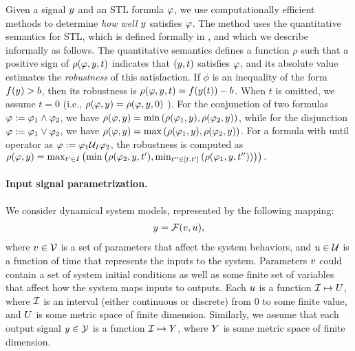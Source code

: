 Given a signal $y$ and an STL formula $\varphi$, we use computationally efficient methods to determine \emph{how well} $y$ satisfies $\varphi$.
The method uses the quantitative semantics for STL, which 
is defined formally in \cite{DonzeM10}, and which we describe informally as follows. The
quantitative semantics defines a function $\rho$ such that a positive sign of
$\rho(\varphi,y,t)$ indicates that $(y,t)$ satisfies
$\varphi$, and its absolute value estimates the \emph{robustness} of
this satisfaction. If $\phi$ is an inequality of the form
$f(y)>b$, then its robustness is $\rho(\varphi,y,t) = f(y(t))-b$.  
When $t$ is omitted, we assume $t=0$ (i.e., $\rho(\varphi,y)=\rho(\varphi,y,0)$ ).
For the conjunction of two
formulas $\varphi := \varphi_1 \wedge \varphi_2$, we have
$\rho(\varphi,y)=\min \left( \rho(\varphi_1,y),\rho(\varphi_2,y)\right)$,
while for the disjunction $\varphi := \varphi_1 \vee \varphi_2$, we have
$\rho(\varphi,y)=\max\left(\rho(\varphi_1,y),\rho(\varphi_2,y)\right)$.
For a formula with until operator as $\varphi := \varphi_1 \mathcal{U}_I \varphi_2$,
the robustness is computed as $\rho(\varphi,y) = \max_{t^\prime\in
  I}\left(\min\left(\rho(\varphi_2,y,t^\prime),\min_{t^{\prime\prime}\in
  [t,t^\prime]}\left(\rho(\varphi_1,y,t^{\prime\prime})\right)\right)\right).$

\paragraph{Input signal parametrization.} We consider dynamical system models, represented by the following mapping:
\begin{eqnarray}
y = \mathcal{F} (v, u),
\end{eqnarray}
where $v \in \mathcal{V}$ is a set of parameters that affect the system behaviors, and $u \in \mathcal{U}$ is a function of time that represents the inputs to the system.
Parameters $v$ could contain a set of system initial conditions as well as some finite set of variables that affect how the system maps inputs to outputs.
Each $u$ is a function $\mathcal{I} \mapsto U$, where $\mathcal{I}$ is an interval (either continuous or discrete) from $0$ to some finite value, and $U$ is some metric space of finite dimension.
Similarly, we assume that each output signal $y \in \mathcal{Y}$ is a function $\mathcal{I} \mapsto Y$, where $Y$ is some metric space of finite dimension.

